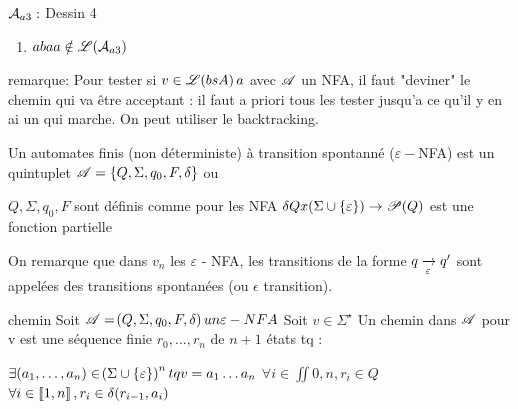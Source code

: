 \documentclass[a4paper,french,bookmarks]{book}
\begin{document}
    \begin{example}{}{}
        $\mathcal{A}_{a3} :$
        \newline
        Dessin 4
        \newline 
        
        \begin{enumerate}
            \item 
            
            
            \itt $abaa \notin \mathscr{L}(\mathcal{A}_{a3})$
        \end{enumerate}
    \end{example}
    
    
    remarque: Pour tester si $v\in \mathscr{L}\!\left(bsA\right) a$ avec $\mathscr{A}$ un NFA, il faut "deviner" le chemin qui va être acceptant : il faut a priori tous les tester jusqu'a ce qu'il y en ai un qui marche. On peut utiliser le backtracking.
    
    \begin{definition}{}{}
        Un automates finis (non déterministe) 
        à transition spontanné ($\varepsilon -$NFA) %
        est un quintuplet $\mathscr{A} = \left\{Q, \Sigma, q_0, F, \delta\right\}$ ou 
        
        \begin{enumerate}
            \itt $Q, \Sigma, q_0, F$ sont définis comme pour les NFA
            \itt $\delta Q x \!\left(\Sigma \cup \left\{\varepsilon\right\}\right) \to \mathscr{P} \!\left(Q\right)$ est une fonction partielle
        \end{enumerate}
        
    \end{definition}
    
    On remarque que dans $v_n$ les $\varepsilon$ - NFA,  les transitions de la forme $q \lima{\epsilon} q'$ sont appelées des transitions spontanées (ou $\epsilon$ transition).
    
    
    \begin{definition}{chemin}{}
        Soit $\mathscr{A} = \!\left(Q, \Sigma, q_0, F, \delta\right) un \varepsilon-NFA$ Soit $v \in \Sigma^\star$ Un chemin dans $\mathscr{A}$ pour v est une séquence finie $r_0, \dots , r_n$ de $n+1$ états tq :
        
        \begin{enumerate}
            \itt $\exists (a_1, \dots, a_n) \in \!\left(\Sigma \cup \left\{\varepsilon\right\}\right)^n tq v = a_1 \dots a_n$
            \itt $\forall i \in \iint{0, n}, r_i \in Q$
            \itt $\forall i \in \left\llbracket1, n\right\rrbracket, r_i \in \delta \!\left(r_{i-1}, a_i\right)$
        \end{enumerate}
            
    \end{definition}
    
\end{document}
